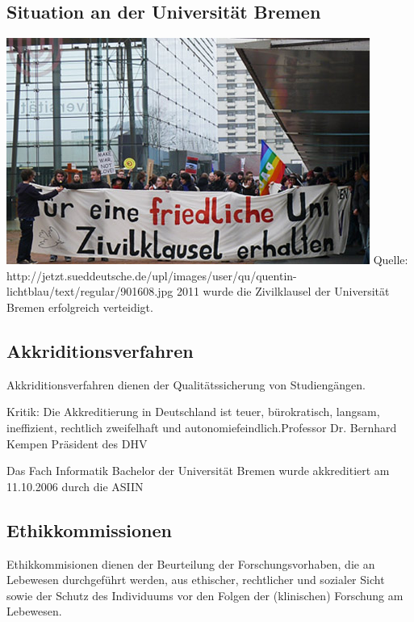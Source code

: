 \subsection*{Situation an der Universität Bremen}
\begin{frame}
\includegraphics[scale=0.5]{images/zivilklausel.jpg}
Quelle: http://jetzt.sueddeutsche.de/upl/images/user/qu/quentin-lichtblau/text/regular/901608.jpg
2011 wurde die Zivilklausel der Universität Bremen erfolgreich verteidigt.
\end{frame}

\subsection*{Akkriditionsverfahren}
\begin{frame}
Akkriditionsverfahren dienen der Qualitätssicherung von Studiengängen.
\end{frame}

\begin{frame}
Kritik:
\glqq Die Akkreditierung in Deutschland ist teuer, bürokratisch, langsam, ineffizient, rechtlich zweifelhaft und autonomiefeindlich.\grqq Professor Dr. Bernhard Kempen Präsident des DHV
\end{frame}

\begin{frame}
Das Fach Informatik Bachelor der Universität Bremen wurde  
akkreditiert am 11.10.2006 durch die ASIIN
\end{frame}

\subsection*{Ethikkommissionen}
\begin{frame}
Ethikkommisionen dienen der Beurteilung der Forschungsvorhaben, die an Lebewesen durchgeführt werden, aus ethischer, rechtlicher und sozialer Sicht sowie der Schutz des Individuums vor den Folgen der (klinischen) Forschung am Lebewesen.

\end{frame}

